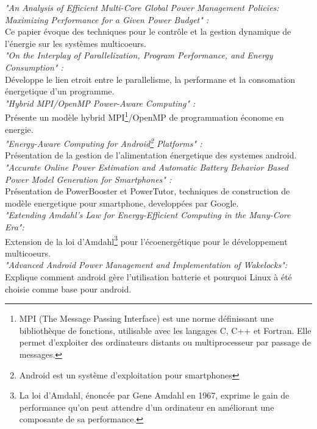 	\textit {"An Analysis of Efficient Multi-Core Global Power Management Policies: Maximizing Performance for a Given Power Budget" :} \\
		Ce papier évoque des techniques pour le contrôle et la gestion dynamique de l'énergie sur les systèmes multicoeurs.\\

	\textit {"On the Interplay of Parallelization, Program Performance, and Energy Consumption" :}\\
		Développe le lien etroit entre le parallelisme, la performane et la consomation énergetique d'un programme.\\

	\textit {"Hybrid MPI/OpenMP Power-Aware Computing" :}\\
		Présente un modèle hybrid MPI\footnote{MPI (The Message Passing Interface) est une norme définissant une bibliothèque de fonctions, utilisable avec les langages C, C++ et Fortran. Elle permet d'exploiter des ordinateurs distants ou multiprocesseur par passage de messages.}/OpenMP de programmation économe en energie.\\

	\textit {"Energy-Aware Computing for Android\footnote{Android est un système d'exploitation pour smartphones} Platforms" :}\\
		Présentation de la gestion de l'alimentation énergetique des systemes android.\\ 

	\textit {"Accurate Online Power Estimation and Automatic Battery Behavior Based Power Model Generation for Smartphones" : }\\
		Présentation de PowerBooster et PowerTutor, techniques de construction de modèle energetique pour smartphone, developpées par Google.\\

	\textit {"Extending Amdahl’s Law for Energy-Efficient Computing in the Many-Core Era":}\\
		Extension de la loi d'Amdahl\footnote{La loi d'Amdahl, énoncée par Gene Amdahl en 1967, exprime le gain de performance qu'on peut attendre d'un ordinateur en améliorant une composante de sa performance.} pour l'écoenergétique pour le développement multicoeurs.\\

	\textit {"Advanced Android Power Management and Implementation of Wakelocks":}\\
		Explique comment android gère l'utilisation batterie et pourquoi Linux à été choisie comme base pour android.\\

